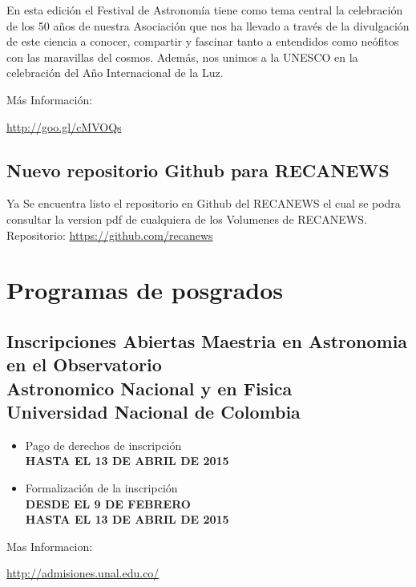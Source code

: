 \documentclass{book}
\begin{document}
\noindent En esta edición el Festival de Astronomía tiene como tema central la celebración de los 50 años de nuestra Asociación que nos ha llevado a través de la divulgación de este ciencia a conocer, compartir y fascinar tanto a entendidos como neófitos con las maravillas del cosmos. Además, nos unimos a la UNESCO en la celebración del Año Internacional de la Luz.

\noindent Más Información:
\begin{center}
\url{http://goo.gl/cMVOQs}
\end{center}
\subsection{Nuevo repositorio Github para RECANEWS}

Ya Se encuentra listo el repositorio en Github del RECANEWS el cual se podra consultar la version pdf de cualquiera de los Volumenes de RECANEWS.\\

Repositorio: \url{https://github.com/recanews}



\newpage
{}
\section*{Programas de posgrados}


\subsection{Inscripciones Abiertas Maestria en Astronomia en el Observatorio\\ Astronomico Nacional y en Fisica\\ Universidad Nacional de Colombia}

\begin{itemize}
\item Pago de derechos de inscripción \\
\textbf{HASTA EL 13 DE ABRIL DE 2015}
\item Formalización de la inscripción\\
\textbf{DESDE EL 9 DE FEBRERO}\\
\textbf{HASTA EL 13 DE ABRIL DE 2015}
\end{itemize}

Mas Informacion:
\begin{center}
\url{http://admisiones.unal.edu.co/}
\end{center}
\end{document}
